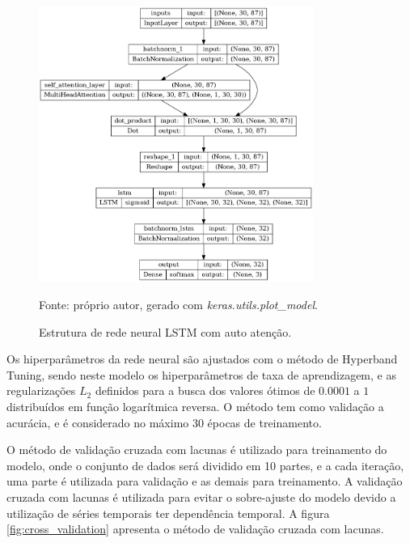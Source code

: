         \begin{figure}[H]
            \centering
            \caption{Estrutura de rede neural LSTM com auto atenção.}
            \label{fig:model_lstm_SelfAtt}
            \includegraphics[width=0.8\textwidth]{./imagens/lstm_selfatt.png}
            \par \footnotesize Fonte: próprio autor, gerado com \textit{keras.utils.plot\_model}.
        \end{figure}


        \ipar Os hiperparâmetros da rede neural são ajustados com o método de Hyperband Tuning, sendo neste modelo os hiperparâmetros de taxa de aprendizagem, e as regularizações $L_{2}$ definidos para a busca dos valores ótimos de $0.0001$ a $1$ distribuídos em função logarítmica reversa. O método tem como validação a acurácia, e é considerado no máximo 30 épocas de treinamento.

        \ipar O método de validação cruzada com lacunas é utilizado para treinamento do modelo, onde o conjunto de dados será dividido em 10 partes, e a cada iteração, uma parte é utilizada para validação e as demais para treinamento. A validação cruzada com lacunas é utilizada para evitar o sobre-ajuste do modelo devido a utilização de séries temporais ter dependência temporal. A figura \ref{fig:cross_validation} apresenta o método de validação cruzada com lacunas.

